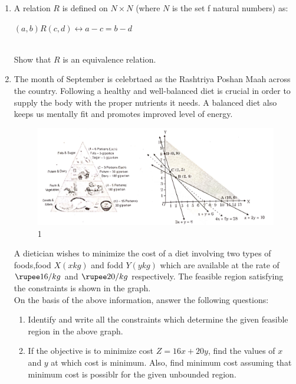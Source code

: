 \documentclass{article}
\begin{document}
\begin{enumerate}
	\item A relation $R$ is defined on $N \times N$ (where $N$ is the set f natural numbers) as:\\
		\centerline{$(a,b)R(c,d) \leftrightarrow a - c = b - d$}\\
	Show that $R$ is an equivalence relation.
        \item The month of September is celebrtaed as the Rashtriya Poshan Maah across the country. Following a healthy and well-balanced diet is crucial in order to supply the body with the proper nutrients it needs. A balanced diet also keeps us mentally fit and promotes improved level of energy.\\
		\begin{figure}[h]
			\centering 
			      \includegraphics[width=120mm]{./Figuress/Graphs.jpg}
			      \caption{1}
			\label{figure}
		\end{figure}
		A dietician wishes to minimize the cost of a diet involving two types of foods,food $X (x kg)$ and fodd $Y (y kg)$ which are available at the rate of $\rupee 16/kg$ and $\rupee 20/kg$ respectively. The feasible region satisfying the constraints is shown in the graph.\\
		On the basis of the above information, answer the following questions:
		\begin{enumerate}[label=(\roman*)]
			\item Identify and write all the constraints which determine the given feasible region in the above graph.
			\item If the objective is to minimize cost $Z = 16x +20y$, find the values of $x$ and $y$ at which cost is minimum. Also, find minimum cost assuming that minimum cost is possiblr for the given unbounded region.
		\end{enumerate}
\end{enumerate}
\end{document}
